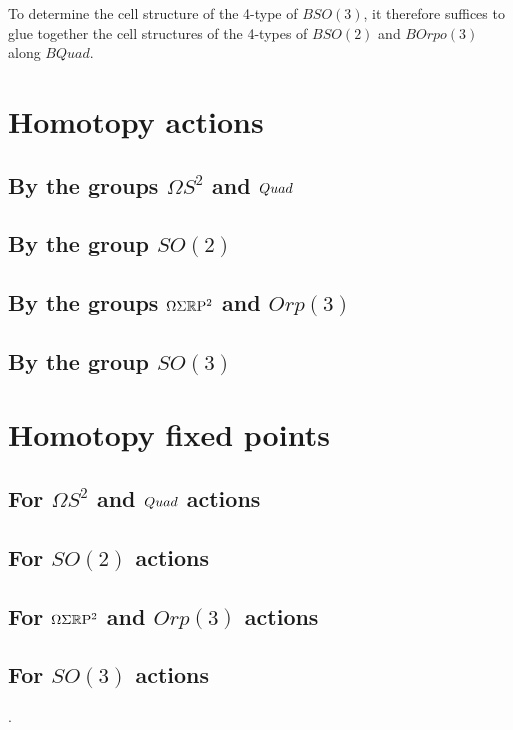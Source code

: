 \documentclass{amsart}
\begin{document}
To determine the cell structure of the 4-type of $BSO(3)$, it therefore suffices to glue together the cell structures of the 4-types of $BSO(2)$ and $BOrpo(3)$ along $BQuad$.

\begin{proposition}
\end{proposition}

\section{Homotopy actions}


\subsection{By the groups $\Omega S^2$ and $Quad$}


\subsection{By the group $SO(2)$}


\subsection{By the groups $\Omega \Sigma \mathbb R \mathrm{P}^2$ and $Orp(3)$}


\subsection{By the group $SO(3)$}


\section{Homotopy fixed points}



\subsection{For $\Omega S^2$ and $Quad$ actions}


\subsection{For $SO(2)$ actions}


\subsection{For $\Omega \Sigma \mathbb R \mathrm{P}^2$ and $Orp(3)$ actions}


\subsection{For $SO(3)$ actions}

.
\end{document}
